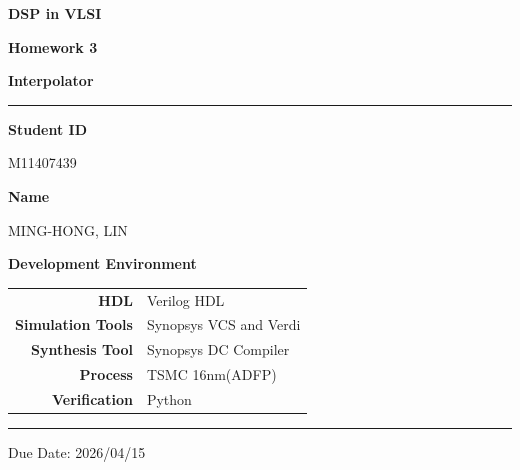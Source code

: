 \documentclass[12pt,a4paper]{report}
\begin{document}
\pagestyle{plain}

\begin{titlepage}
\centering
\vspace*{3cm}

{\fontsize{28}{34}\selectfont\bfseries DSP in VLSI\par}
\vspace{0.6em}
{\fontsize{20}{26}\selectfont\bfseries Homework 3\par}
\vspace{0.4em}
{\fontsize{16}{22}\selectfont\bfseries Interpolator\par}

\vspace{1.5cm}
\textcolor{crimson}{\rule{0.6\linewidth}{1.2pt}}
\vspace{1.5cm}

{\large\bfseries Student ID}\par
\vspace{0.4em}
{\large M11407439}\par

\vspace{0.8em}

{\large\bfseries Name}\par
\vspace{0.4em}
{\large MING-HONG, LIN}\par

\vspace{2cm}

{\large\bfseries Development Environment}\par
\vspace{0.8em}
\begin{tabular}{rl}
    \textbf{HDL}              & Verilog HDL \\[4pt]
    \textbf{Simulation Tools} & Synopsys VCS and Verdi \\[4pt]
    \textbf{Synthesis Tool}   & Synopsys DC Compiler \\[4pt]
    \textbf{Process}          & TSMC 16nm(ADFP) \\[4pt]
    \textbf{Verification}     & Python \\
\end{tabular}

\vfill

\textcolor{crimson}{\rule{0.6\linewidth}{0.6pt}}\par
\vspace{0.5em}
{\small Due Date: 2026/04/15}

\end{titlepage}
\end{document}
